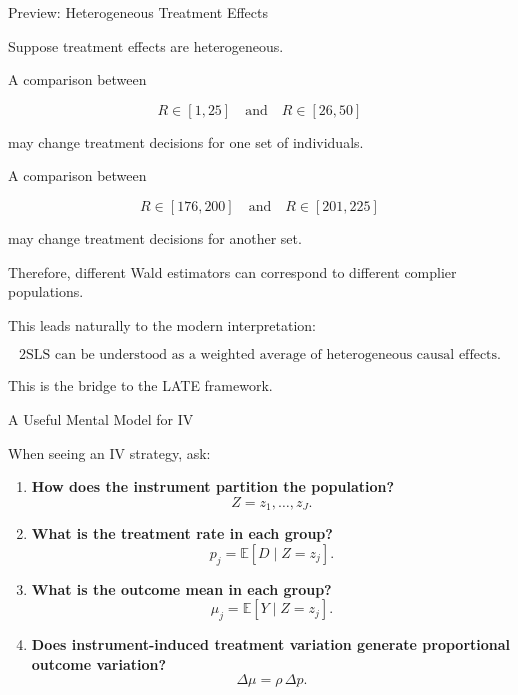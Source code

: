 \documentclass[aspectratio=169]{beamer}
\newcommand{\E}{\mathbb{E}}
\begin{document}
\begin{frame}{Preview: Heterogeneous Treatment Effects}

Suppose treatment effects are heterogeneous.

A comparison between

\[
R\in[1,25]
\quad\text{and}\quad
R\in[26,50]
\]

may change treatment decisions for one set of individuals.

A comparison between

\[
R\in[176,200]
\quad\text{and}\quad
R\in[201,225]
\]

may change treatment decisions for another set.

Therefore, different Wald estimators can correspond to different complier populations.

\vspace{0.3cm}

This leads naturally to the modern interpretation:

\[
\boxed{
\text{2SLS can be understood as a weighted average of heterogeneous causal effects.}
}
\]

This is the bridge to the LATE framework.

\end{frame}

\begin{frame}{A Useful Mental Model for IV}

When seeing an IV strategy, ask:

\begin{enumerate}
    \item \textbf{How does the instrument partition the population?}
    \[
    Z=z_1,\ldots,z_J.
    \]

    \item \textbf{What is the treatment rate in each group?}
    \[
    p_j=\E[D\mid Z=z_j].
    \]

    \item \textbf{What is the outcome mean in each group?}
    \[
    \mu_j=\E[Y\mid Z=z_j].
    \]

    \item \textbf{Does instrument-induced treatment variation generate proportional outcome variation?}
    \[
    \Delta\mu
    =
    \rho\,\Delta p.
    \]
\end{enumerate}

\end{frame}
\end{document}

